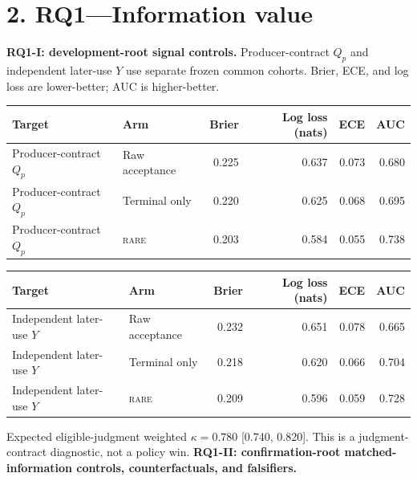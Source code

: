 \documentclass[10pt,a4paper,landscape]{article}
\newcommand{\rare}{\textsc{rare}}\newcommand{\na}{\textsc{n/a}}\newcommand{\nog}{\textsc{no-go}}\newcommand{\ok}{\textsc{pass}}
\begin{document}
\section*{2. RQ1---Information value}
\textbf{RQ1-I: development-root signal controls.} Producer-contract $Q_p$ and independent later-use $Y$ use separate frozen common cohorts. Brier, ECE, and log loss are lower-better; AUC is higher-better.
\begin{center}\small\begin{tabular}{llrrrr}\toprule Target & Arm & Brier & Log loss (nats) & ECE & AUC \\\midrule
Producer-contract $Q_p$ & Raw acceptance & 0.225 & 0.637 & 0.073 & 0.680 \\

Producer-contract $Q_p$ & Terminal only & 0.220 & 0.625 & 0.068 & 0.695 \\

Producer-contract $Q_p$ & \rare{} & 0.203 & 0.584 & 0.055 & 0.738 \\

\bottomrule\end{tabular}\end{center}
\begin{center}\small\begin{tabular}{llrrrr}\toprule Target & Arm & Brier & Log loss (nats) & ECE & AUC \\\midrule
Independent later-use $Y$ & Raw acceptance & 0.232 & 0.651 & 0.078 & 0.665 \\

Independent later-use $Y$ & Terminal only & 0.218 & 0.620 & 0.066 & 0.704 \\

Independent later-use $Y$ & \rare{} & 0.209 & 0.596 & 0.059 & 0.728 \\

\bottomrule\end{tabular}\end{center}
Expected eligible-judgment weighted $\kappa=0.780$ [0.740, 0.820]. This is a judgment-contract diagnostic, not a policy win.
\textbf{RQ1-II: confirmation-root matched-information controls, counterfactuals, and falsifiers.}
\end{document}
